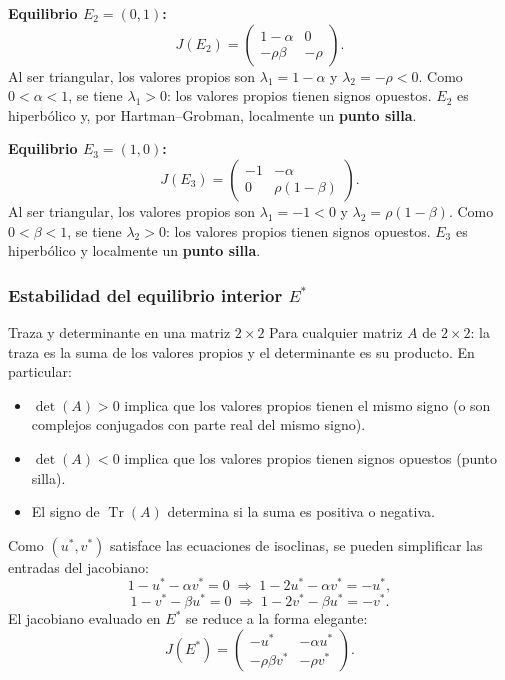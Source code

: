 \documentclass[11pt,letterpaper]{article}
\begin{document}
\textbf{Equilibrio $E_2=(0,1)$:}
\[
J(E_2)=\begin{pmatrix}1-\alpha & 0\\ -\rho\beta & -\rho\end{pmatrix}.
\]
Al ser triangular, los valores propios son $\lambda_1=1-\alpha$ y $\lambda_2=-\rho<0$.
Como $0<\alpha<1$, se tiene $\lambda_1>0$: los valores propios tienen signos opuestos.
$E_2$ es hiperbólico y, por Hartman--Grobman, localmente un \textbf{punto silla}.

\textbf{Equilibrio $E_3=(1,0)$:}
\[
J(E_3)=\begin{pmatrix}-1 & -\alpha\\ 0 & \rho(1-\beta)\end{pmatrix}.
\]
Al ser triangular, los valores propios son $\lambda_1=-1<0$ y $\lambda_2=\rho(1-\beta)$.
Como $0<\beta<1$, se tiene $\lambda_2>0$: los valores propios tienen signos opuestos.
$E_3$ es hiperbólico y localmente un \textbf{punto silla}.

\subsubsection*{Estabilidad del equilibrio interior $E^*$}

\begin{observacion}{Traza y determinante en una matriz $2\times 2$}{}
Para cualquier matriz $A$ de $2\times 2$: la traza es la suma de los valores propios y el determinante es su producto. En particular:
\begin{itemize}
    \item $\det(A)>0$ implica que los valores propios tienen el mismo signo (o son complejos conjugados con parte real del mismo signo).
    \item $\det(A)<0$ implica que los valores propios tienen signos opuestos (punto silla).
    \item El signo de $\operatorname{Tr}(A)$ determina si la suma es positiva o negativa.
\end{itemize}
\end{observacion}

Como $(u^*,v^*)$ satisface las ecuaciones de isoclinas, se pueden simplificar las entradas del jacobiano:
\[
1-u^*-\alpha v^*=0 \;\Rightarrow\; 1-2u^*-\alpha v^* = -u^*,
\]
\[
1-v^*-\beta u^*=0 \;\Rightarrow\; 1-2v^*-\beta u^* = -v^*.
\]
El jacobiano evaluado en $E^*$ se reduce a la forma elegante:
\[
\boxed{J(E^*)=\begin{pmatrix}-u^* & -\alpha u^*\\ -\rho\beta v^* & -\rho v^*\end{pmatrix}.}
\]
\end{document}
